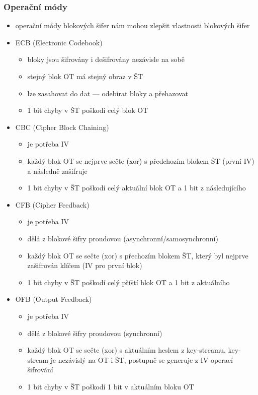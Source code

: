 \subsubsection*{Operační módy}
\begin{itemize}
	\item operační módy blokových šifer nám mohou zlepšit vlastnosti blokových šifer
	\item ECB (Electronic Codebook)
	\begin{itemize}
		\item bloky jsou šifrovány i dešifrovány nezávisle na sobě
		\item stejný blok OT má stejný obraz v ŠT
		\item lze zasahovat do dat --- odebírat bloky a přehazovat
		\item 1 bit chyby v ŠT poškodí celý blok OT
	\end{itemize}
	\item CBC (Cipher Block Chaining)
	\begin{itemize}
		\item je potřeba IV
		\item každý blok OT se nejprve sečte (xor) s předchozím blokem ŠT (první IV) a následně zašifruje
		\item 1 bit chyby v ŠT poškodí celý aktuální blok OT a 1 bit z následujícího
	\end{itemize}
	\item CFB (Cipher Feedback)
	\begin{itemize}
		\item je potřeba IV
		\item dělá z blokové šifry proudovou (asynchronní/samosynchronní)
		\item každý blok OT se sečte (xor) s přechozím blokem ŠT, který byl nejprve zašifrován klíčem (IV pro první blok)
		\item 1 bit chyby v ŠT poškodí celý příští blok OT a 1 bit z aktuálního
	\end{itemize}
	\item OFB (Output Feedback)
	\begin{itemize}
		\item je potřeba IV
		\item dělá z blokové šifry proudovou (synchronní)
		\item každý blok OT se sečte (xor) s aktuálním heslem z key-streamu, key-stream je nezávislý na OT i ŠT, postupně se generuje z IV operací šifrování
		\item 1 bit chyby v ŠT poškodí 1 bit v aktuálním bloku OT
	\end{itemize}
	

\end{itemize}
